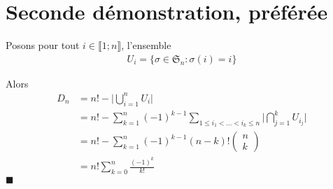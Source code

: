 \documentclass{article}
\newcommand*{\QED}{\hfill\ensuremath{\blacksquare}}%
\begin{document}
\section{Seconde démonstration, préférée}
Posons pour tout $i\in\llbracket 1;n\rrbracket$, l'ensemble 
\begin{align*}
U_i = \{\sigma \in \mathfrak{S}_n : \sigma(i) = i\}
\end{align*}

Alors
\begin{align*}
D_n &= n!-\bigg|\bigcup_{i=1}^n U_i\bigg|\\
&= n!-\sum_{k=1}^n (-1)^{k-1}\sum_{1\leq i_1<\ldots<i_k\leq n}\bigg|\bigcap_{j=1}^{k}U_{i_j}\bigg|\\
&= n!-\sum_{k=1}^n (-1)^{k-1}(n-k)!\begin{pmatrix}
n\\k
\end{pmatrix}\\
&=n!\sum_{k=0}^n \frac{(-1)^k}{k!}
\end{align*}
\QED
\end{document}
